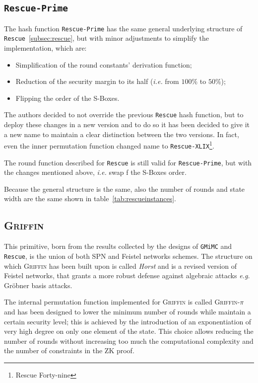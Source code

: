 \documentclass[12pt, a4paper]{report}
\begin{document}
\subsection{\texttt{Rescue-Prime}}\label{subsec:rescueprime}

The hash function \texttt{Rescue-Prime} has the same general underlying structure of \texttt{Rescue}~\ref{subsec:rescue}, but with minor adjustments to simplify the implementation, which are:
\begin{itemize}
  \item Simplification of the round constants' derivation function;
  \item Reduction of the security margin to its half (\textsl{i.e.} from $100\%$ to $50\%$);
  \item Flipping the order of the S-Boxes.
\end{itemize}

The authors decided to not override the previous \texttt{Rescue} hash function, but to deploy these changes in a new version and to do so it has been decided to give it a new name to maintain a clear distinction between the two versions.
In fact, even the inner permutation function changed name to \texttt{Rescue-XLIX}\footnote{Rescue Forty-nine}.

The round function described for \texttt{Rescue} is still valid for \texttt{Rescue-Prime}, but with the changes mentioned above, \textsl{i.e.} swap f the S-Boxes order.

Because the general structure is the same, also the number of rounds and state width are the same shown in table~\ref{tab:rescueinstances}.

\subsection{\textsc{Griffin}}\label{subsec:griffin}

This primitive, born from the results collected by the designs of \texttt{GMiMC} and \texttt{Rescue}, is the union of both SPN and Feistel networks schemes.
The structure on which \textsc{Griffin} has been built upon is called \textit{Horst} and is a revised version of Feistel networks, that grants a more robust defense against algebraic attacks \textsl{e.g.} Gr\"obner basis attacks.

The internal permutation function implemented for \textsc{Griffin} is called \textsc{Griffin-$\pi$} and has been designed to lower the minimum number of rounds while maintain a certain security level; this is achieved by the introduction of an exponentiation of very high degree on only one element of the state. This choice allows reducing the number of rounds without increasing too much the computational complexity and the number of constraints in the ZK proof.
\end{document}
